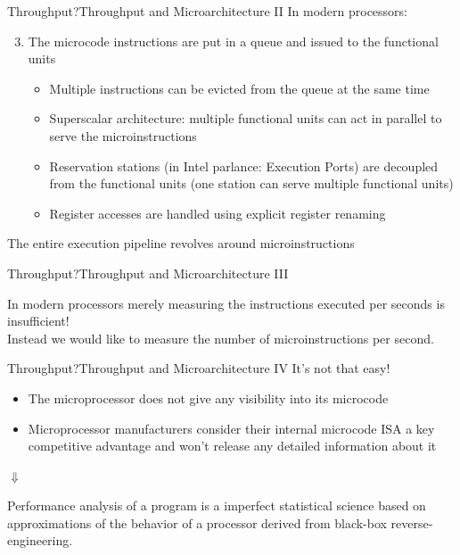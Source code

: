 \begin{frame}{Throughput?}{Throughput and Microarchitecture II}
In modern processors:
\begin{enumerate}
\setcounter{enumi}{2}
\item The microcode instructions are put in a queue and issued to the functional units
\begin{itemize}
	\item Multiple instructions can be evicted from the queue at the same time
	\item Superscalar architecture: multiple \alert{functional units} can act in parallel to serve the microinstructions
	\item \alert{Reservation stations} (in Intel parlance: \alert{Execution Ports}) are decoupled from the functional units (one station can serve multiple functional units)
	\item Register accesses are handled using \alert{explicit register renaming}
	\end{itemize}
\end{enumerate}
\bigskip
The entire execution pipeline revolves around \alert{microinstructions}
\end{frame}


\begin{frame}{Throughput?}{Throughput and Microarchitecture III}
\begin{center}
In modern processors merely measuring the instructions executed per seconds is \alert{insufficient}!\\
\bigskip
Instead we would like to measure the number of \alert{microinstructions} per second.
\end{center}
\end{frame}


\begin{frame}{Throughput?}{Throughput and Microarchitecture IV}
It's not that easy!
\begin{itemize}
\item The microprocessor does not give any visibility into its microcode
\item Microprocessor manufacturers consider their internal microcode ISA a \alert{key competitive advantage} and won't release any detailed information about it
\end{itemize}
\bigskip
\begin{centering}
$\Downarrow$\\
\end{centering}
\bigskip
Performance analysis of a program is a \alert{imperfect statistical science} based on \alert{approximations} of the behavior of a processor derived from \alert{black-box reverse-engineering}.
\end{frame}


